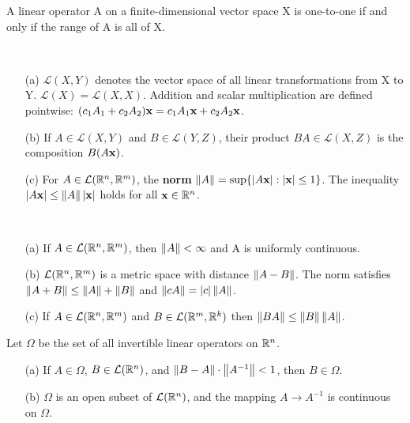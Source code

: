 \begin{theorem}
  \label{thm:chap9:linear_op_one_to_one_iff_onto}
  A linear operator A on a finite-dimensional vector space X is
  one-to-one if and only if the range of A is all of X.
\end{theorem}

\begin{definition}
  \label{def:chap9:LXY_norm}
  ~ %
  \begin{enumerate}
    \item[(a)] $\mathcal{L}(X, Y)$ denotes the vector space of all
      linear transformations from X to Y. $\mathcal{L}(X) =
      \mathcal{L}(X, X)$. Addition and scalar multiplication are
      defined pointwise: $(c_1 A_1 + c_2 A_2)\mathbf{x} = c_1 A_1
      \mathbf{x} + c_2 A_2 \mathbf{x}$.

    \item[(b)] If $A \in \mathcal{L}(X, Y)$ and $B \in \mathcal{L}(Y,
      Z)$, their product $BA \in \mathcal{L}(X, Z)$ is the
      composition $B(A\mathbf{x})$.

    \item[(c)] For $A \in \mathcal{L}(\mathbb{R}^n, \mathbb{R}^m)$, the \textbf{norm}
      $\left\lVert A \right\rVert = \sup \{ |A\mathbf{x}| : |\mathbf{x}| \le 1 \}$. The
      inequality $|A\mathbf{x}| \le \left\lVert A \right\rVert |\mathbf{x}|$ holds for all
      $\mathbf{x} \in \mathbb{R}^n$.
  \end{enumerate}
\end{definition}

\begin{theorem}
  \label{thm:chap9:operator_norm_properties}
  ~ %
  \begin{enumerate}
    \item[(a)] If $A \in \mathcal{L}(\mathbb{R}^n, \mathbb{R}^m)$, then $\left\lVert A \right\rVert <
      \infty$ and A is uniformly continuous.
    \item[(b)] $\mathcal{L}(\mathbb{R}^n, \mathbb{R}^m)$ is a metric space with
      distance $\left\lVert A-B \right\rVert$. The norm satisfies $\left\lVert A+B \right\rVert \le
      \left\lVert A \right\rVert + \left\lVert B \right\rVert$ and $\left\lVert cA \right\rVert = |c|\left\lVert A \right\rVert$.
    \item[(c)] If $A \in \mathcal{L}(\mathbb{R}^n, \mathbb{R}^m)$ and $B \in
      \mathcal{L}(\mathbb{R}^m, \mathbb{R}^k)$ then $\left\lVert BA \right\rVert \le \left\lVert B \right\rVert \left\lVert A \right\rVert$.
  \end{enumerate}
\end{theorem}

\begin{theorem}
  \label{thm:chap9:invertible_operators_open_set}
  Let $\Omega$ be the set of all invertible linear operators on $\mathbb{R}^n$.
  \begin{enumerate}
    \item[(a)] If $A \in \Omega$, $B \in \mathcal{L}(\mathbb{R}^n)$, and
      $\left\lVert B - A \right\rVert \cdot \left\lVert A^{-1} \right\rVert < 1$, then $B \in \Omega$.
    \item[(b)] $\Omega$ is an open subset of $\mathcal{L}(\mathbb{R}^n)$, and
      the mapping $A \to A^{-1}$ is continuous on $\Omega$.
  \end{enumerate}
\end{theorem}

